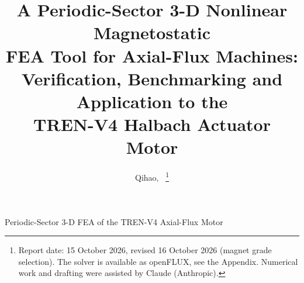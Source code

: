\documentclass[journal]{IEEEtran}
\begin{document}
\title{A Periodic-Sector 3-D Nonlinear Magnetostatic\\ FEA Tool for Axial-Flux Machines:\\ Verification, Benchmarking and Application to the\\ TREN-V4 Halbach Actuator Motor}

\author{Qihao,~%
\thanks{Report date: 15 October 2026, revised 16 October 2026 (magnet grade selection). The solver is available as openFLUX, see the Appendix. Numerical work and drafting were assisted by Claude (Anthropic).}}

%
{Periodic-Sector 3-D FEA of the TREN-V4 Axial-Flux Motor}

\maketitle
\end{document}
